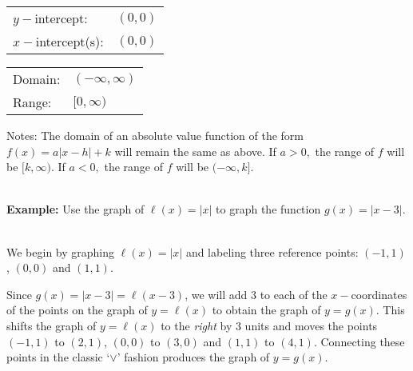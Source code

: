 \documentclass[12pt]{article}
\theoremstyle{definition}
\begin{document}
\begin{multicols}{2}
\begin{tabular}{ll}
$y-$intercept: & $(0,0)$\\
$x-$intercept(s): & $(0,0)$
\end{tabular}

\columnbreak
\begin{tabular}{ll}
Domain: & $(-\infty,\infty)$\\
Range: & $[0,\infty)$
\end{tabular}
\end{multicols}
Notes: The domain of an absolute value function of the form $f(x)=a|x-h|+k$ will remain the same as above.  If $a>0,$ the range of $f$ will be $[k,\infty)$.  If $a<0,$ the range of $f$ will be $(-\infty,k]$.\\
\ \par
{\bf Example:} Use the graph of $\ell(x) = |x|$ to graph the function $g(x) = |x-3|$.\\
\ \par
We begin by graphing $\ell(x) = |x|$ and labeling three reference points: $(-1,1)$, $(0,0)$ and $(1,1)$.

\begin{center}
\end{center}

Since $g(x) = |x-3| = \ell(x-3)$, we will add $3$ to each of the $x-$coordinates of the points on the graph of $y=\ell(x)$ to obtain the graph of $y=g(x)$.   This shifts the graph of $y=\ell(x)$ to the {\it right} by $3$ units and moves the points $(-1,1)$ to $(2,1)$,  $(0,0)$ to $(3,0)$ and $(1,1)$ to $(4,1)$.  Connecting these points in the classic `$\vee$' fashion produces the graph of $y = g(x)$.
\end{document}
